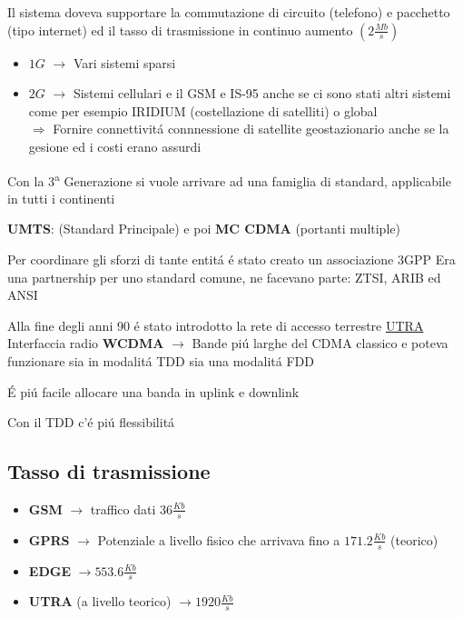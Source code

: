 \documentclass{article}
\begin{document}
Il sistema doveva supportare la commutazione di circuito (telefono) e pacchetto (tipo internet) ed il tasso di trasmissione in continuo aumento $\left(2\frac{Mb}{s}\right)$

\begin{itemize}
    \item $1G$ $\rightarrow$ Vari sistemi sparsi
    \item $2G$ $\rightarrow$ Sistemi cellulari e il GSM e IS-95 anche se ci sono stati altri sistemi come per esempio IRIDIUM (costellazione di satelliti) o global\\
        $\Rightarrow$ Fornire connettivit\'a connnessione di satellite geostazionario anche se la gesione ed i costi erano assurdi
\end{itemize}

Con la 3\textsuperscript{a} Generazione si vuole arrivare ad una famiglia di standard, applicabile in tutti i continenti

\textbf{UMTS}: (Standard Principale) e poi \textbf{MC CDMA} (portanti multiple)


Per coordinare gli sforzi di tante entit\'a \'e stato creato un associazione 3GPP
Era una partnership per uno standard comune, ne facevano parte: ZTSI, ARIB ed ANSI

Alla fine degli anni 90 \'e stato introdotto la rete di accesso terrestre \underline{UTRA}
Interfaccia radio \textbf{WCDMA} $\rightarrow$ Bande pi\'u larghe del CDMA classico e  poteva funzionare sia in modalit\'a TDD sia una modalit\'a FDD

\'E pi\'u facile allocare una banda in uplink e downlink

Con il TDD c'\'e pi\'u flessibilit\'a


\subsection{Tasso di trasmissione}
\begin{itemize}
    \item \textbf{GSM} $\rightarrow$ traffico dati $36 \frac{Kb}{s}$
    \item \textbf{GPRS} $\rightarrow$ Potenziale a livello fisico che arrivava fino a $171.2\frac{Kb}{s}$ (teorico)
    \item \textbf{EDGE} $\rightarrow 553.6\frac{Kb}{s}$
    \item \textbf{UTRA} (a livello teorico) $\rightarrow 1920\frac{Kb}{s}$
\end{itemize}
\end{document}
